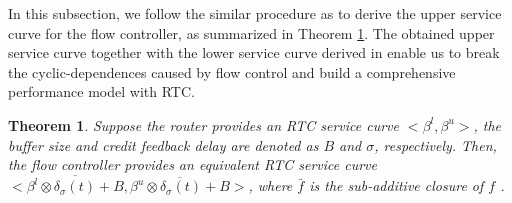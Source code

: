 \documentclass[10pt,journal]{IEEEtran}
\newtheorem{theorem}{Theorem}
\begin{document}
In this subsection, we follow the similar procedure as \cite{qian2009analysis} to derive the upper service curve for the flow controller, as summarized in Theorem \ref{credit}. The obtained upper service curve together with the lower service curve derived in \cite{qian2009analysis} enable us to break the cyclic-dependences caused by flow control and build a comprehensive performance model with RTC.
\begin{theorem}\label{credit}
Suppose the router provides an RTC service curve $<\beta^l,\beta^u>$, the buffer size and credit feedback delay are denoted as $B$ and $\sigma$, respectively. Then, the flow controller provides an equivalent RTC service curve $<\overline{\beta^l\otimes\delta_\sigma(t)+B},\overline{\beta^u\otimes\delta_\sigma(t)+B}>$, where $\bar{f}$ is the sub-additive closure of $f$ \cite{Boudec2001Network}.
\end{theorem}
\end{document}
